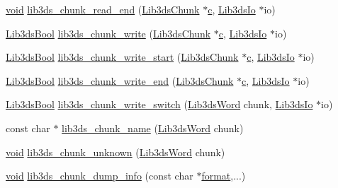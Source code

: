 \begin{DoxyCompactItemize}
\item 
\hyperlink{group___u_a_v_objects_plugin_ga444cf2ff3f0ecbe028adce838d373f5c}{void} \hyperlink{group__chunk_ga7c9bbe72febb5b580f8ec8c3fbced45e}{lib3ds\-\_\-chunk\-\_\-read\-\_\-end} (\hyperlink{struct_lib3ds_chunk}{Lib3ds\-Chunk} $\ast$\hyperlink{glext_8h_a1f2d7f8147412c43ba2303a56f97ee73}{c}, \hyperlink{struct_lib3ds_io}{Lib3ds\-Io} $\ast$io)
\item 
\hyperlink{types_8h_a89dd7398a9ebbbf28011f8c32df67ad3}{Lib3ds\-Bool} \hyperlink{group__chunk_ga2ba3200e0ef7e21ca9acd3d011cbb424}{lib3ds\-\_\-chunk\-\_\-write} (\hyperlink{struct_lib3ds_chunk}{Lib3ds\-Chunk} $\ast$\hyperlink{glext_8h_a1f2d7f8147412c43ba2303a56f97ee73}{c}, \hyperlink{struct_lib3ds_io}{Lib3ds\-Io} $\ast$io)
\item 
\hyperlink{types_8h_a89dd7398a9ebbbf28011f8c32df67ad3}{Lib3ds\-Bool} \hyperlink{group__chunk_ga4b40e0934a794ce40d08a5a0067ae8bb}{lib3ds\-\_\-chunk\-\_\-write\-\_\-start} (\hyperlink{struct_lib3ds_chunk}{Lib3ds\-Chunk} $\ast$\hyperlink{glext_8h_a1f2d7f8147412c43ba2303a56f97ee73}{c}, \hyperlink{struct_lib3ds_io}{Lib3ds\-Io} $\ast$io)
\item 
\hyperlink{types_8h_a89dd7398a9ebbbf28011f8c32df67ad3}{Lib3ds\-Bool} \hyperlink{group__chunk_gab67b7d6bf2096e6aa0088f9a1167b95d}{lib3ds\-\_\-chunk\-\_\-write\-\_\-end} (\hyperlink{struct_lib3ds_chunk}{Lib3ds\-Chunk} $\ast$\hyperlink{glext_8h_a1f2d7f8147412c43ba2303a56f97ee73}{c}, \hyperlink{struct_lib3ds_io}{Lib3ds\-Io} $\ast$io)
\item 
\hyperlink{types_8h_a89dd7398a9ebbbf28011f8c32df67ad3}{Lib3ds\-Bool} \hyperlink{group__chunk_ga6a3d6945341fe89c79bf5e347ac03c84}{lib3ds\-\_\-chunk\-\_\-write\-\_\-switch} (\hyperlink{types_8h_a439f68d12f4ad080599044949e41dba1}{Lib3ds\-Word} chunk, \hyperlink{struct_lib3ds_io}{Lib3ds\-Io} $\ast$io)
\item 
const char $\ast$ \hyperlink{group__chunk_ga1fb9ee3390c0ef81a3c0ebe58ed3655b}{lib3ds\-\_\-chunk\-\_\-name} (\hyperlink{types_8h_a439f68d12f4ad080599044949e41dba1}{Lib3ds\-Word} chunk)
\item 
\hyperlink{group___u_a_v_objects_plugin_ga444cf2ff3f0ecbe028adce838d373f5c}{void} \hyperlink{group__chunk_ga493e7c0f4160e8d838ee8d2199de6b46}{lib3ds\-\_\-chunk\-\_\-unknown} (\hyperlink{types_8h_a439f68d12f4ad080599044949e41dba1}{Lib3ds\-Word} chunk)
\item 
\hyperlink{group___u_a_v_objects_plugin_ga444cf2ff3f0ecbe028adce838d373f5c}{void} \hyperlink{group__chunk_ga7c648ef879a53d37415e5192064e22b2}{lib3ds\-\_\-chunk\-\_\-dump\-\_\-info} (const char $\ast$\hyperlink{glext_8h_a86f086d889f7cdb4d6461497ae891265}{format},...)
\end{DoxyCompactItemize}


